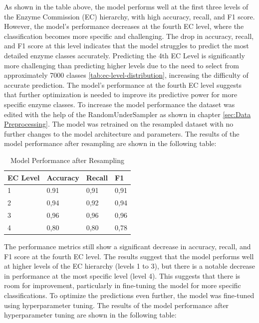 As shown in the table above, the model performs well at the first three levels of the Enzyme Commission (EC) hierarchy, with high accuracy, recall, and F1 score. However, the model's performance decreases at the fourth EC level, where the classification becomes more specific and challenging. The drop in accuracy, recall, and F1 score at this level indicates that the model struggles to predict the most detailed enzyme classes accurately. Predicting the 4th EC Level is significantly more challenging than predicting higher levels due to the need to select from approximately 7000 classes \ref{tab:ec-level-distribution}, increasing the difficulty of accurate prediction. The model's performance at the fourth EC level suggests that further optimization is needed to improve its predictive power for more specific enzyme classes. To increase the model performance the dataset was edited with the help of the RandomUnderSampler as shown in chapter \ref{sec:Data Preprocessing}. The model was retrained on the resampled dataset with no further changes to the model architecture and parameters. The results of the model performance after resampling are shown in the following table:

\begin{table}[hbt]
    \centering
    \begin{tabular}{@{}llll@{}}
    \toprule
    \textbf{EC Level} & \textbf{Accuracy} & \textbf{Recall} & \textbf{F1} \\ \midrule
    1                 & 0.91              & 0,91            & 0,91        \\
    2                 & 0,94              & 0,92            & 0,94        \\
    3                 & 0,96              & 0,96            & 0,96        \\
    4                 & 0,80              & 0,80            & 0,78        \\ \bottomrule
    \end{tabular}
    \caption{Model Performance after Resampling}
    \label{tab:performance-after-resampling}
\end{table}

The performance metrics still show a significant decrease in accuracy, recall, and F1 score at the fourth EC level. The results suggest that the model performs well at higher levels of the EC hierarchy (levels 1 to 3), but there is a notable decrease in performance at the most specific level (level 4). This suggests that there is room for improvement, particularly in fine-tuning the model for more specific classifications. To optimize the predictions even further, the model was fine-tuned using hyperparameter tuning. The results of the model performance after hyperparameter tuning are shown in the following table:


